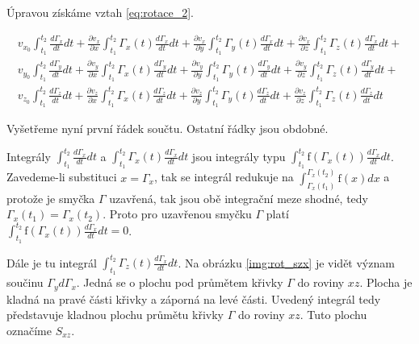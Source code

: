 Úpravou získáme vztah \eqref{eq:rotace_2}.

\begin{equation}
\label{eq:rotace_2}
\begin{matrix}
v_{x_0} \int_{t_1}^{t_2} \frac{d \Gamma_x}{dt} dt + \frac{\partial v_x}{\partial x} \int_{t_1}^{t_2} \Gamma_x(t) \frac{d \Gamma_x}{dt} dt + \frac{\partial v_x}{\partial y} \int_{t_1}^{t_2} \Gamma_y(t) \frac{d \Gamma_x}{dt} dt + \frac{\partial v_x}{\partial z} \int_{t_1}^{t_2} \Gamma_z(t) \frac{d \Gamma_x}{dt} dt + \\
v_{y_0} \int_{t_1}^{t_2} \frac{d \Gamma_y}{dt} dt + \frac{\partial v_y}{\partial x} \int_{t_1}^{t_2} \Gamma_x(t) \frac{d \Gamma_y}{dt} dt + \frac{\partial v_y}{\partial y} \int_{t_1}^{t_2} \Gamma_y(t) \frac{d \Gamma_y}{dt} dt + \frac{\partial v_y}{\partial z} \int_{t_1}^{t_2} \Gamma_z(t) \frac{d \Gamma_y}{dt} dt + \\
v_{z_0} \int_{t_1}^{t_2} \frac{d \Gamma_z}{dt} dt + \frac{\partial v_z}{\partial x} \int_{t_1}^{t_2} \Gamma_x(t) \frac{d \Gamma_z}{dt} dt + \frac{\partial v_z}{\partial y} \int_{t_1}^{t_2} \Gamma_y(t) \frac{d \Gamma_z}{dt} dt + \frac{\partial v_z}{\partial z} \int_{t_1}^{t_2} \Gamma_z(t) \frac{d \Gamma_z}{dt} dt
\end{matrix}
\end{equation}

Vyšetřeme nyní první řádek součtu. Ostatní řádky jsou obdobné.

Integrály \(\int_{t_1}^{t_2} \frac{d \Gamma_x}{dt} dt\) a \(\int_{t_1}^{t_2} \Gamma_x(t) \frac{d \Gamma_x}{dt} dt\) jsou integrály typu \(\int_{t_1}^{t_2} \mathrm{f}(\Gamma_x(t)) \frac{d \Gamma_x}{dt} dt\). Zavedeme-li substituci \(x = \Gamma_x\), tak se integrál redukuje na \(\int_{\Gamma_x(t_1)}^{\Gamma_x(t_2)} \mathrm{f}(x) dx\) a protože je smyčka \(\Gamma\) uzavřená, tak jsou obě integrační meze shodné, tedy \(\Gamma_x(t_1) = \Gamma_x(t_2)\). Proto pro uzavřenou smyčku \(\Gamma\) platí \(\int_{t_1}^{t_2} \mathrm{f}(\Gamma_x(t)) \frac{d \Gamma_x}{dt} dt = 0\).

Dále je tu integrál \(\int_{t_1}^{t_2} \Gamma_z(t) \frac{d \Gamma_x}{dt} dt\). Na obrázku \ref{img:rot_szx} je vidět význam součinu \(\Gamma_y d \Gamma_x\). Jedná se o plochu pod průmětem křivky \(\Gamma\) do roviny \(xz\). Plocha je kladná na pravé části křivky a záporná na levé části. Uvedený integrál tedy představuje kladnou plochu průmětu křivky \(\Gamma\) do roviny \(xz\). Tuto plochu označíme \(S_{xz}\).

